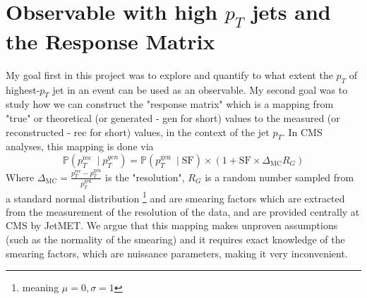 







\section{Observable with high $p_T$ jets and the Response Matrix}
\label{jet_order_response}

My goal first in this project was to explore and quantify to what extent the $p_T$ of highest-$p_T$ jet in an event can be used as an observable. My second goal was to study how we can construct the "response matrix" which is a mapping from "true" or theoretical (or generated - gen for short) values to the measured (or reconstructed - rec for short) values, in the context of the jet $p_T$. In CMS analyses, this mapping is done via
\begin{equation}
    \mathbb{P}\left(p_{T}^{\text {rec }} \mid p_{T}^{g e n}\right)=   \mathbb{P}\left(p_{T}^{\text {gen }} \mid \mathrm{SF} \right)
    \times\left(1+\mathrm{SF} \times \Delta_{\mathrm{MC}} R_{G}\right)
\end{equation}
Where $\Delta_{\mathrm{MC}}    =\frac{p_{T}^{\mathrm{rec}}-p_{T}^{\mathrm{gen}}}{p_{T}^{\mathrm{gen}}}$ is the "resolution", $R_G$ is a random number sampled from a standard normal distribution \footnote{meaning $\mu=0, \sigma=1$} and  are smearing factors which are extracted from the measurement of the resolution of the data, and are provided centrally at CMS by JetMET. We argue that this mapping makes unproven assumptions (such as the normality of the smearing) and it requires exact knowledge of the smearing factors, which are nuissance parameters, making it very inconvenient.




